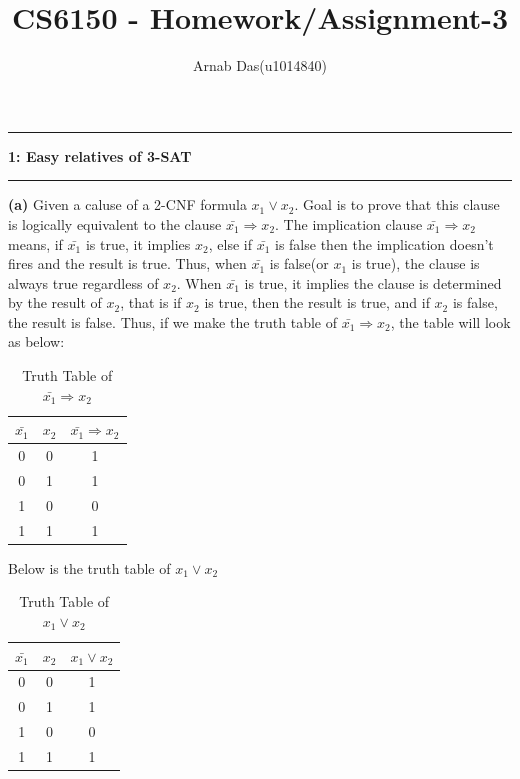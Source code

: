 \documentclass{article}
\title{CS6150 - Homework/Assignment-3}
\author{Arnab Das(u1014840)}
\newcommand\question[2]{\vspace{.25in}\hrule\textbf{#1: #2}\hrule\vspace{.10in}}
\renewcommand\part[1]{\vspace{.10in}\textbf{(#1)}}
\begin{document}
  \maketitle
  \newpage
  \newcommand\NAME{ARNAB DAS}
  \newcommand\UID{uxxxxxxx}
  \newcommand\HWNUM{3}

  \question{1}{Easy relatives of 3-SAT}
	\part{a} Given a caluse of a 2-CNF formula $x_{1} \vee x_{2}$. Goal is to prove that this clause is logically equivalent to the clause $\bar{x_{1}} \Rightarrow x_{2}$.  The implication clause $\bar{x_{1}} \Rightarrow x_{2}$ means, if $\bar{x_{1}}$ is true, it implies $x_{2}$, else if $\bar{x_{1}}$ is false then the implication doesn't fires and the result is true. Thus, when $\bar{x_{1}}$ is false(or $x_{1}$ is true), the clause is always true regardless of $x_{2}$. When $\bar{x_{1}}$ is true, it implies the clause is determined by the result of $x_{2}$, that is if $x_{2}$ is true, then the result is true, and if $x_{2}$ is false, the result is false. Thus, if we make the truth table of $\bar{x_{1}} \Rightarrow x_{2}$, the table will look as below: \newline
\begin{table}[ht]
  \caption{Truth Table of $\bar{x_{1}} \Rightarrow x_{2}$}
  \centering
  \begin{tabular}{c c c }
  \hline\hline
  $\bar{x_{1}}$ & $x_{2}$ & $\bar{x_{1}} \Rightarrow x_{2}$ \\[0.5ex]
  \hline
  0 & 0 & 1 \\
  0 & 1 & 1 \\
  1 & 0 & 0 \\
  1 & 1 & 1 \\ [0.5ex]
  \end{tabular}
  \label{table:nonlin}
  \end{table}	  

Below is the truth table of $x_{1} \vee x_{2}$ \newline
\begin{table}[ht]
  \caption{Truth Table of $x_{1} \vee x_{2}$}
  \centering
  \begin{tabular}{c c c }
  \hline\hline
  $\bar{x_{1}}$ & $x_{2}$ & ${x_{1}} \vee x_{2}$ \\[0.5ex]
  \hline
  0 & 0 & 1 \\
  0 & 1 & 1 \\
  1 & 0 & 0 \\
  1 & 1 & 1 \\ [0.5ex]
  \end{tabular}
  \label{table:nonlin}
  \end{table}	 
\end{document}
